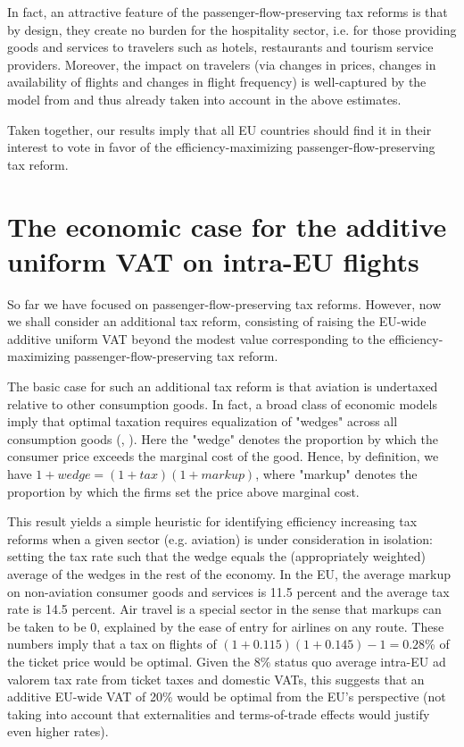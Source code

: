 \documentclass[../../main]{subfiles}
\begin{document}
In fact, an attractive feature of the passenger-flow-preserving tax reforms is that by design, they create no burden for the hospitality sector, i.e. for those providing goods and services to travelers such as hotels, restaurants and tourism service providers. Moreover, the impact on travelers (via changes in prices, changes in availability of flights and changes in flight frequency) is well-captured by the model from \citet{Dörpinghaus_et_al_2026} and thus already taken into account in the above estimates.

Taken together, our results imply that all EU countries should find it in their interest to vote in favor of the efficiency-maximizing passenger-flow-preserving tax reform.


\section{The economic case for the additive uniform VAT on intra-EU flights}

So far we have focused on passenger-flow-preserving tax reforms. However, now we shall consider an additional tax reform, consisting of raising the EU-wide additive uniform VAT beyond the modest value corresponding to the efficiency-maximizing passenger-flow-preserving tax reform.

The basic case for such an additional tax reform is that aviation is undertaxed relative to other consumption goods. In fact, a broad class of economic models imply that optimal taxation requires equalization of "wedges" across all consumption goods (\citet{atkinson1976design}, \citet{epifani2011trade}). Here the "wedge" denotes the proportion by which the consumer price exceeds the marginal cost of the good. Hence, by definition, we have $1+wedge=(1+tax)(1+markup)$, where "markup" denotes the proportion by which the firms set the price above marginal cost.

This result yields a simple heuristic for identifying efficiency increasing tax reforms when a given sector (e.g. aviation) is under consideration in isolation: setting the tax rate such that the wedge equals the (appropriately weighted) average of the wedges in the rest of the economy. In the EU, the average markup on non-aviation consumer goods and services is 11.5 percent and the average tax rate is 14.5 percent. Air travel is a special sector in the sense that markups can be taken to be 0, explained by the ease of entry for airlines on any route. These numbers imply that a tax on flights of $(1+0.115)(1+0.145)-1=0.28$\% %
of the ticket price would be optimal. Given the $8\%$ status quo average intra-EU ad valorem tax rate from ticket taxes and domestic VATs, this suggests that an additive EU-wide VAT of 20\% would be optimal from the EU's perspective (not taking into account that externalities and terms-of-trade effects 
would justify even higher rates). %
\end{document}
